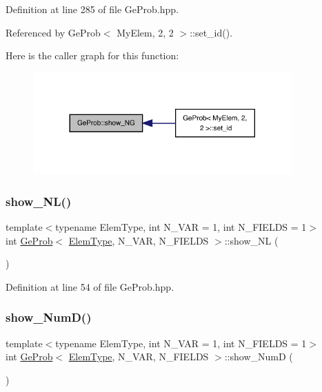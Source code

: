 Definition at line 285 of file Ge\+Prob.\+hpp.



Referenced by Ge\+Prob$<$ My\+Elem, 2, 2 $>$\+::set\+\_\+id().

Here is the caller graph for this function\+:
\nopagebreak
\begin{figure}[H]
\begin{center}
\leavevmode
\includegraphics[width=281pt]{classGeProb_a2f37b74c21a3bdc3fc112babc8a0123b_icgraph}
\end{center}
\end{figure}
\mbox{\label{classGeProb_a6a4db729e1c6eab1165fb861b16649ac}} 
\subsubsection{\texorpdfstring{show\+\_\+\+N\+L()}{show\_NL()}}
{\footnotesize\ttfamily template$<$typename Elem\+Type, int N\+\_\+\+V\+AR = 1, int N\+\_\+\+F\+I\+E\+L\+DS = 1$>$ \\
int \hyperlink{classGeProb}{Ge\+Prob}$<$ \hyperlink{spectral_8h_aaa2c1a7b2d1b12c590d730fe6ac839fa}{Elem\+Type}, N\+\_\+\+V\+AR, N\+\_\+\+F\+I\+E\+L\+DS $>$\+::show\+\_\+\+NL (\begin{DoxyParamCaption}{ }\end{DoxyParamCaption})\hspace{0.3cm}{\ttfamily [inline]}}



Definition at line 54 of file Ge\+Prob.\+hpp.

\mbox{\label{classGeProb_a95d6202865332fd522738383003d7b25}} 
\subsubsection{\texorpdfstring{show\+\_\+\+Num\+D()}{show\_NumD()}}
{\footnotesize\ttfamily template$<$typename Elem\+Type, int N\+\_\+\+V\+AR = 1, int N\+\_\+\+F\+I\+E\+L\+DS = 1$>$ \\
int \hyperlink{classGeProb}{Ge\+Prob}$<$ \hyperlink{spectral_8h_aaa2c1a7b2d1b12c590d730fe6ac839fa}{Elem\+Type}, N\+\_\+\+V\+AR, N\+\_\+\+F\+I\+E\+L\+DS $>$\+::show\+\_\+\+NumD (\begin{DoxyParamCaption}{ }\end{DoxyParamCaption})\hspace{0.3cm}{\ttfamily [inline]}}



